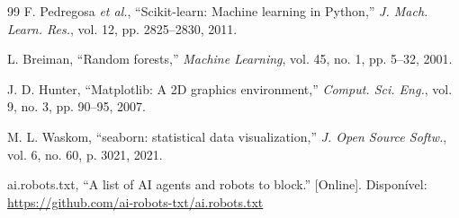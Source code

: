 \documentclass[conference]{IEEEtran}
\begin{document}
\begin{thebibliography}{99}
F. Pedregosa \emph{et al.}, ``Scikit-learn: Machine learning in Python,'' \emph{J. Mach. Learn. Res.},
vol. 12, pp. 2825--2830, 2011.

L. Breiman, ``Random forests,'' \emph{Machine Learning}, vol. 45, no. 1, pp. 5--32, 2001.

J. D. Hunter, ``Matplotlib: A 2D graphics environment,'' \emph{Comput. Sci. Eng.}, vol. 9, no. 3,
pp. 90--95, 2007.

M. L. Waskom, ``seaborn: statistical data visualization,'' \emph{J. Open Source Softw.}, vol. 6, no. 60,
p. 3021, 2021.

ai.robots.txt, ``A list of AI agents and robots to block.'' [Online]. Disponível:
\url{https://github.com/ai-robots-txt/ai.robots.txt}

\end{thebibliography}
\end{document}
